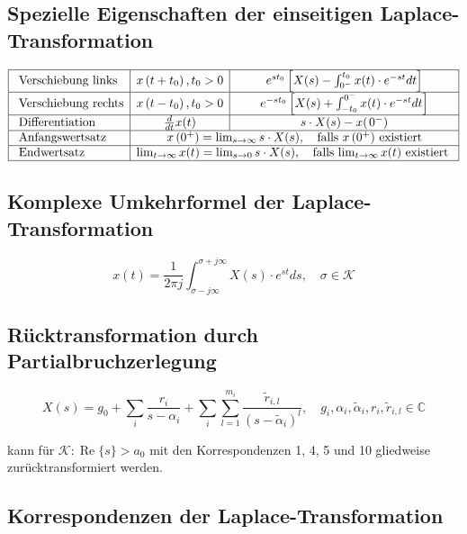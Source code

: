 \subsection{Spezielle Eigenschaften der einseitigen Laplace-Transformation}

$$
\begin{array}{|l|c|c|}
\hline \text { Verschiebung links} & x\left(t+t_{0}\right), t_{0}>0 & e^{s t_{0}}\left[X(s)-\int_{0^{-}}^{t_{0}} x(t) \cdot e^{-s t} d t\right] \\
\hline \text { Verschiebung rechts} & x\left(t-t_{0}\right), t_{0}>0 & e^{-s t_{0}}\left[X(s)+\int_{-t_{0}}^{0^{-}} x(t) \cdot e^{-s t} d t\right] \\
\hline \text { Differentiation} & \frac{d}{d t} x(t) &  s \cdot X(s) - x( \left.0^{-}\right)\\
\hline \text { Anfangswertsatz} & \multicolumn{2}{c|}{x\left(0^{+}\right)=\lim _{s \rightarrow \infty} s \cdot X(s), \quad \text{falls $x\left(0^{+}\right)$ existiert}}\\
\hline \text { Endwertsatz} & \multicolumn{2}{c|}{\lim _{t \rightarrow \infty} x(t)=\lim _{s \rightarrow 0} s \cdot X(s), \quad \text{falls $\lim _{t \rightarrow \infty} x(t)$ existiert }} \\
\hline
\end{array}
$$




\subsection{Komplexe Umkehrformel der Laplace-Transformation}

$$
x(t)=\frac{1}{2 \pi j} \int_{\sigma-j \infty}^{\sigma+j \infty} X(s) \cdot e^{s t} d s, \quad \sigma \in \mathcal{K}
$$

\subsection{Rücktransformation durch Partialbruchzerlegung}

$$
X(s)=g_{0}+\sum_{i} \frac{r_{i}}{s-\alpha_{i}}+\sum_{i} \sum_{l=1}^{m_{i}} \frac{\tilde{r}_{i, l}}{\left(s-\tilde{\alpha}_{i}\right)^{l}}, \quad g_{i}, \alpha_{i}, \tilde{\alpha}_{i}, r_{i}, \tilde{r}_{i, l} \in \mathbb{C}
$$

kann für $\mathcal{K}: \operatorname{Re}\{s\}>a_{0}$ mit den Korrespondenzen 1, 4, 5 und 10 gliedweise zurücktransformiert werden.

\subsection{Korrespondenzen der Laplace-Transformation}


